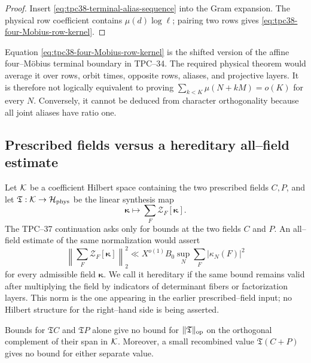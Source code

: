\begin{proof}
Insert \eqref{eq:tpc38-terminal-alias-sequence} into the Gram expansion.
The physical row coefficient contains \(\mu(d)\log\ell\); pairing two rows
gives \eqref{eq:tpc38-four-Mobius-row-kernel}.
\end{proof}

Equation \eqref{eq:tpc38-four-Mobius-row-kernel} is the shifted version of
the affine four--M\"obius terminal boundary in TPC--34.  The required
physical theorem would average it over rows, orbit times, opposite rows,
aliases, and projective layers.  It is therefore not logically equivalent
to proving
\(\sum_{k<K}\mu(N+kM)=o(K)\) for every \(N\).  Conversely, it cannot be
deduced from character orthogonality because all joint aliases have ratio
one.

\subsection{Prescribed fields versus a hereditary all--field estimate}

Let \(\mathcal K\) be a coefficient Hilbert space containing the two prescribed
fields \(C,P\), and let \(\mathfrak T:\mathcal K\to\mathcal H_{\rm phys}\) be the linear
synthesis map
\begin{equation}
 \boldsymbol\kappa\longmapsto
 \sum_F\mathscr Z_F[\boldsymbol\kappa].
 \label{eq:tpc38-formal-synthesis-map}
\end{equation}
The TPC--37 continuation asks only for bounds at the two fields \(C\) and
\(P\).  An all--field estimate of the same normalization would assert
\begin{equation}
 \left\|\sum_F\mathscr Z_F[\boldsymbol\kappa]\right\|_2^2
 \ll X^{o(1)}B_0
 \sup_N\sum_F|\kappa_N(F)|^2
 \label{eq:tpc38-all-field-estimate}
\end{equation}
for every admissible field \(\boldsymbol\kappa\).  We call it hereditary if
the same bound remains valid after multiplying the field by indicators of
determinant fibers or factorization layers.  This norm is the one appearing
in the earlier prescribed--field input; no Hilbert structure for the
right--hand side is being asserted.

\begin{proposition}
\label{prop:tpc38-two-test-dichotomy}
Bounds for \(\mathfrak T C\) and \(\mathfrak T P\) alone give no bound for
\(\|\mathfrak T\|_{\operatorname{op}}\) on the orthogonal complement of their span in
\(\mathcal K\).
Moreover, a small recombined value
\(\mathfrak T(C+P)\) gives no bound for either separate value.
\end{proposition}

